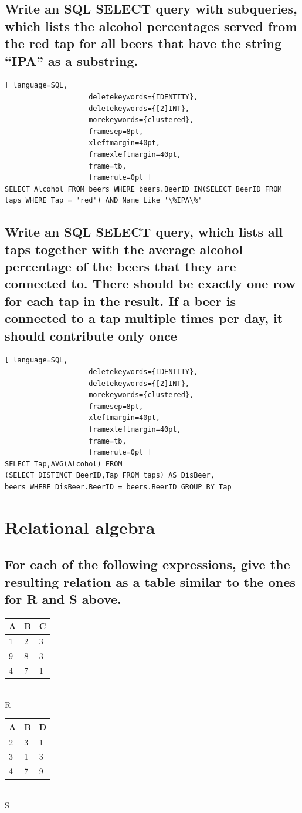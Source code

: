 \documentclass[12pt, a4paper]{article}
\newcommand{\beginSQL}{\begin{lstlisting}[ language=SQL,
                    deletekeywords={IDENTITY},
                    deletekeywords={[2]INT},
                    morekeywords={clustered},
                    framesep=8pt,
                    xleftmargin=40pt,
                    framexleftmargin=40pt,
                    frame=tb,
                    framerule=0pt ]}
\begin{document}
		\subsection{Write an SQL SELECT query with subqueries, which lists the alcohol percentages served from the red tap for all beers that have the string “IPA” as a substring.}
			\beginSQL
SELECT Alcohol FROM beers WHERE beers.BeerID IN(SELECT BeerID FROM taps WHERE Tap = 'red') AND Name Like '\%IPA\%'\end{lstlisting}
		\subsection{Write an SQL SELECT query, which lists all taps together with the average alcohol percentage of the beers that they are connected to. There should be exactly one row for each tap in the result. If a beer is connected to a tap multiple times per day, it should contribute only once}
			\beginSQL
SELECT Tap,AVG(Alcohol) FROM 
(SELECT DISTINCT BeerID,Tap FROM taps) AS DisBeer,
beers WHERE DisBeer.BeerID = beers.BeerID GROUP BY Tap\end{lstlisting}
	\clearpage
	\section{Relational algebra}
		\subsection{For each of the following expressions, give the resulting relation as a table similar to the ones for R and S above.}
			
			\begin{minipage}{0.45\textwidth}
			\centering	
			\begin{tabular}{|l|l|l|}
			\hline
			A & B  & C \\ \hline
			1 & 2 & 3 \\ \hline
			9 & 8 & 3 \\ \hline
			4 & 7 & 1 \\ \hline
			\end{tabular}\\[4mm]
			R
			\end{minipage}
			\begin{minipage}{0.45\textwidth}
			\centering	
			\begin{tabular}{|l|l|l|}
			\hline
			A & B & D \\ \hline
			2 & 3 & 1\\ \hline
			3 & 1 & 3\\ \hline
			4 & 7 & 9\\ \hline
			\end{tabular}\\[4mm]
			S
			\end{minipage}
\end{document}
